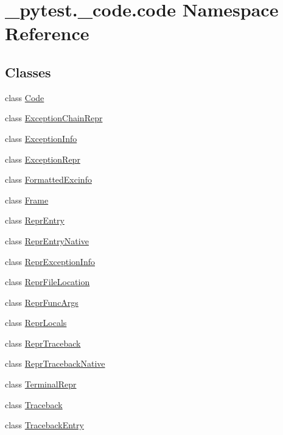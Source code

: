\hypertarget{namespace__pytest_1_1__code_1_1code}{}\section{\+\_\+pytest.\+\_\+code.\+code Namespace Reference}
\label{namespace__pytest_1_1__code_1_1code}
\subsection*{Classes}
\begin{DoxyCompactItemize}
\item 
class \hyperlink{class__pytest_1_1__code_1_1code_1_1_code}{Code}
\item 
class \hyperlink{class__pytest_1_1__code_1_1code_1_1_exception_chain_repr}{Exception\+Chain\+Repr}
\item 
class \hyperlink{class__pytest_1_1__code_1_1code_1_1_exception_info}{Exception\+Info}
\item 
class \hyperlink{class__pytest_1_1__code_1_1code_1_1_exception_repr}{Exception\+Repr}
\item 
class \hyperlink{class__pytest_1_1__code_1_1code_1_1_formatted_excinfo}{Formatted\+Excinfo}
\item 
class \hyperlink{class__pytest_1_1__code_1_1code_1_1_frame}{Frame}
\item 
class \hyperlink{class__pytest_1_1__code_1_1code_1_1_repr_entry}{Repr\+Entry}
\item 
class \hyperlink{class__pytest_1_1__code_1_1code_1_1_repr_entry_native}{Repr\+Entry\+Native}
\item 
class \hyperlink{class__pytest_1_1__code_1_1code_1_1_repr_exception_info}{Repr\+Exception\+Info}
\item 
class \hyperlink{class__pytest_1_1__code_1_1code_1_1_repr_file_location}{Repr\+File\+Location}
\item 
class \hyperlink{class__pytest_1_1__code_1_1code_1_1_repr_func_args}{Repr\+Func\+Args}
\item 
class \hyperlink{class__pytest_1_1__code_1_1code_1_1_repr_locals}{Repr\+Locals}
\item 
class \hyperlink{class__pytest_1_1__code_1_1code_1_1_repr_traceback}{Repr\+Traceback}
\item 
class \hyperlink{class__pytest_1_1__code_1_1code_1_1_repr_traceback_native}{Repr\+Traceback\+Native}
\item 
class \hyperlink{class__pytest_1_1__code_1_1code_1_1_terminal_repr}{Terminal\+Repr}
\item 
class \hyperlink{class__pytest_1_1__code_1_1code_1_1_traceback}{Traceback}
\item 
class \hyperlink{class__pytest_1_1__code_1_1code_1_1_traceback_entry}{Traceback\+Entry}
\end{DoxyCompactItemize}
